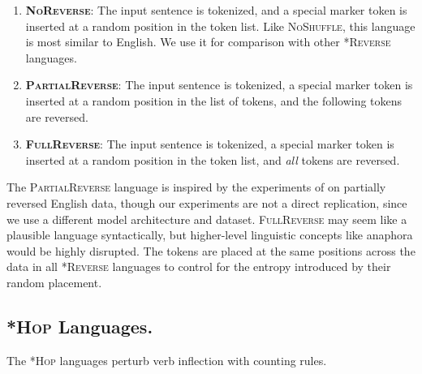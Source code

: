 \documentclass[11pt]{article}
\newcommand{\revmarker}{%
  \setlength{\fboxsep}{1pt}%
  \fbox{\texttt{R}}%
}
\begin{document}
\begin{enumerate}
    \item \textbf{\textcolor{controlrev}{\textsc{NoReverse}}}: The input sentence is tokenized, and a special marker token \revmarker\space is inserted at a random position in the token list. Like \textsc{NoShuffle}, this language is most similar to English. We use it for comparison with other \textsc{*Reverse} languages.

    \item \textbf{\textcolor{partialrev}{\textsc{PartialReverse}}}: The input sentence is  tokenized, a special marker token \revmarker\space is inserted at a random position in the list of tokens, and the following tokens are reversed.

    \item \textbf{\textcolor{fullrev}{\textsc{FullReverse}}}: The input sentence is tokenized, a special marker token \revmarker\space is inserted at a random position in the token list, and \emph{all} tokens are reversed.
    
\end{enumerate}

\vspace{6pt}
\noindent
The \textsc{PartialReverse} language is inspired by the experiments of \citet{mitchell-bowers-2020-priorless} on partially reversed English data, though our experiments are not a direct replication, since we use a different model architecture and dataset. \textsc{FullReverse} may seem like a plausible language syntactically, but higher-level linguistic concepts like anaphora would be highly disrupted.
The \revmarker\space tokens are placed at the same positions across the data in all \textsc{*Reverse} languages to control for the entropy introduced by their random placement.

\subsection{\textsc{*Hop} Languages.}

The \textsc{*Hop} languages perturb verb inflection with counting rules.
\end{document}
